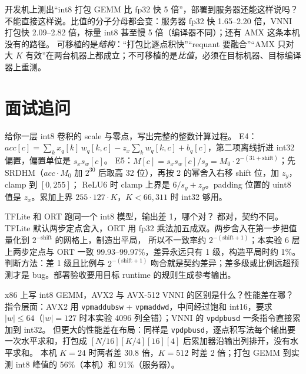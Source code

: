 \documentclass[11pt,a4paper]{ctexart}
\begin{document}
\begin{iqbox}{开发机上测出“int8 打包 GEMM 比 fp32 快 5 倍”，部署到服务器还能这样说吗？}
不能直接这样说。比值的分子分母都会变：服务器 fp32 快 1.65--2.20 倍，VNNI 打包快 2.09--2.82 倍，标量 int8 甚至慢 5 倍（编译器不同）；还有 AMX 这条本机没有的路径。
可移植的是\emph{结构}：“打包比逐点积快”“requant 要融合”“AMX 只对大 $K$ 有效”在两台机器上都成立；不可移植的是\emph{比值}，必须在目标机器、目标编译器上重测。
\end{iqbox}

\section{面试追问}\label{sec:iq}

\begin{iqbox}{给你一层 int8 卷积的 scale 与零点，写出完整的整数计算过程。}
E4：$acc[c] = \sum_k x_q[k]\,w_q[k,c] - z_x\sum_k w_q[k,c] + b_q[c]$，第二项离线折进 int32 偏置，偏置单位是 $s_x s_w[c]$。
E5：$M[c] = s_x s_w[c]/s_y = M_0\cdot 2^{-(31+\mathrm{shift})}$；先 SRDHM（$acc\cdot M_0$ 加 $2^{30}$ 后取高 32 位），再按 2 的幂舍入右移 shift 位，加 $z_y$，clamp 到 $[0,255]$；
ReLU6 时 clamp 上界是 $6/s_y + z_y$。padding 位置的 uint8 值是 $z_x$。累加上界 $255\cdot127\cdot K$，$K<66{,}311$ 时 int32 够用。
\end{iqbox}

\begin{iqbox}{TFLite 和 ORT 跑同一个 int8 模型，输出差 1，哪个对？}
都对，契约不同。TFLite 默认两步定点舍入，ORT 用 fp32 乘法加五成双。两步舍入在第一步把值量化到 $2^{-\mathrm{shift}}$ 的网格上，制造出平局，
所以不一致率约 $2^{-(\mathrm{shift}+1)}$；本实验 6 层上两步定点与 ORT 一致 99.93--99.97\%，差异永远只有 1 级，构造平局时约 1\%。
判断方法：差 1 级且比例与 $2^{-(\mathrm{shift}+1)}$ 吻合就是契约差异；差多级或比例远超预测才是 bug。部署验收要用目标 runtime 的规则生成参考输出。
\end{iqbox}

\begin{iqbox}{x86 上写 int8 GEMM，AVX2 与 AVX-512 VNNI 的区别是什么？性能差在哪？}
指令层面：AVX2 用 \texttt{vpmaddubsw} + \texttt{vpmaddwd}，中间经过饱和 int16，要求 $|w|\le64$（$|w|=127$ 时本实验 4096 列全错）；VNNI 的 \texttt{vpdpbusd} 一条指令直接累加到 int32。
但更大的性能差在布局：同样是 \texttt{vpdpbusd}，逐点积写法每个输出要一次水平求和，打包成 $[N/16][K/4][16][4]$ 后累加器沿输出列排开，没有水平求和。
本机 $K=24$ 时两者差 30.8 倍，$K=512$ 时差 2 倍；打包 GEMM 到实测 int8 峰值的 56\%（本机）和 91\%（服务器）。
\end{iqbox}
\end{document}
